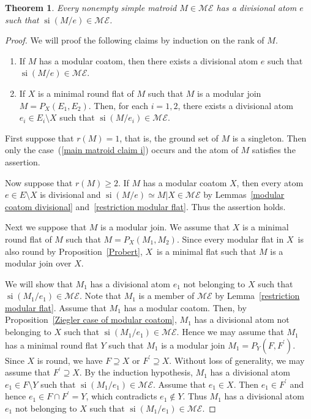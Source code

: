 \documentclass[11pt]{article}
\newtheorem{Theorem}{Theorem}[section]
\DeclareMathOperator{\si}{si}
\begin{document}
\begin{Theorem}\label{main matroid}
Every nonempty simple matroid $ M \in \mathcal{ME} $ has a divisional atom $ e $ such that $ \si(M/e) \in \mathcal{ME} $.
\end{Theorem}
\begin{proof}
We will proof the following claims by induction on the rank of $ M $.
\begin{enumerate}[$(i)$]\itemsep=0pt
\item\label{main matroid claim i} If $ M $ has a modular coatom, then there exists a divisional atom $ e $ such that $ \si(M/e) \in \mathcal{ME} $.
\item\label{main matroid claim ii} If $ X $ is a minimal round flat of $ M $ such that $ M $ is a modular join $ M = P_{X}(E_{1}, E_{2}) $.
Then, for each $ i=1,2 $, there exists a divisional atom $ e_{i} \in E_{i}\setminus X $ such that $ \si(M/e_{i}) \in \mathcal{ME} $.
\end{enumerate}

First suppose that $ r(M) = 1 $, that is, the ground set of $ M $ is a singleton.
Then only the case~(\ref{main matroid claim i}) occurs and the atom of $ M $ satisfies the assertion.

Now suppose that $ r(M) \geq 2 $.
If $ M $ has a modular coatom $ X $, then every atom $ e \in E \setminus X $ is divisional and $ \si(M/e) \simeq M|X \in \mathcal{ME} $ by Lemmas~\ref{modular coatom divisional} and~\ref{restriction modular flat}. Thus the assertion holds.

Next we suppose that $ M $ is a modular join.
We assume that $ X $ is a minimal round flat of $ M $ such that $ M = P_{X}(M_{1},M_{2}) $.
Since every modular flat in $ X $~is also round by Proposition~\ref{Probert}, $ X $~is a minimal flat such that $ M $ is a modular join over $ X $.

We will show that $ M_{1} $ has a divisional atom $ e_{1} $ not belonging to $ X $ such that $ \si(M_{1}/e_{1}) \in \mathcal{ME} $.
Note that $ M_{1} $ is a member of $ \mathcal{ME} $ by Lemma~\ref{restriction modular flat}.
Assume that $ M_{1} $ has a modular coatom.
Then, by Proposition~\ref{Ziegler case of modular coatom}, $ M_{1} $ has a divisional atom not belonging to $ X $ such that $ \si(M_{1}/e_{1}) \in \mathcal{ME} $.
Hence we may assume that $ M_{1} $ has a minimal round flat $ Y $ such that $ M_{1} $ is a modular join $ M_{1} = P_{Y}(F,F^{\prime})$.
Since $ X $ is round, we have $ F \supseteq X $ or $ F^{\prime} \supseteq X $.
Without loss of generality, we may assume that $ F^{\prime} \supseteq X $.
By the induction hypothesis, $ M_{1} $ has a divisional atom $ e_{1} \in F\setminus Y $ such that $ \si(M_{1}/e_{1}) \in \mathcal{ME} $.
Assume that $ e_{1} \in X $.
Then $ e_{1} \in F^{\prime} $ and hence $ e_{1} \in F \cap F^{\prime} = Y $, which contradicts $ e_{1} \not\in Y $.
Thus $ M_{1} $ has a divisional atom $ e_{1} $ not belonging to $ X $ such that $ \si(M_{1}/e_{1}) \in \mathcal{ME} $.


\end{proof}
\end{document}
